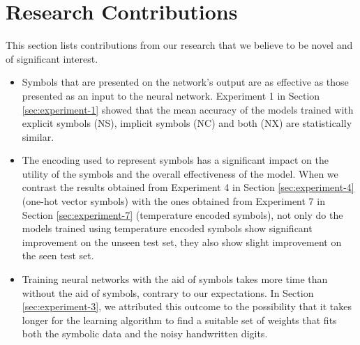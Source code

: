 \section{Research Contributions} \label{sec:findings-and-conclusion-research-contributions}

This section lists contributions from our research that we believe to be novel and of significant interest.

\begin{itemize}
	\item Symbols that are presented on the network's output are as effective as those presented as an input to the neural network. Experiment 1 in Section \ref{sec:experiment-1} showed that the mean accuracy of the models trained with explicit symbols (NS), implicit symbols (NC) and both (NX) are statistically similar.
	\item The encoding used to represent symbols has a significant impact on the utility of the symbols and the overall effectiveness of the model. When we contrast the results obtained from Experiment 4 in Section \ref{sec:experiment-4} (one-hot vector symbols) with the ones obtained from Experiment 7 in Section \ref{sec:experiment-7} (temperature encoded symbols), not only do the models trained using temperature encoded symbols show significant improvement on the unseen test set, they also show slight improvement on the seen test set.
	\item Training neural networks with the aid of symbols takes more time than without the aid of symbols, contrary to our expectations. In Section \ref{sec:experiment-3}, we attributed this outcome to the possibility that it takes longer for the learning algorithm to find a suitable set of weights that fits both the symbolic data and the noisy handwritten digits.
\end{itemize}